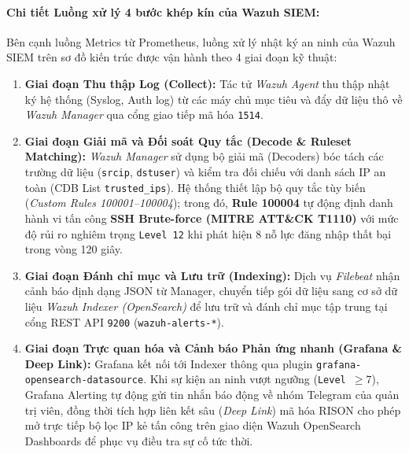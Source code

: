 \documentclass[13pt,a4paper]{extarticle}
\begin{document}
\paragraph{Chi tiết Luồng xử lý 4 bước khép kín của Wazuh SIEM:}
Bên cạnh luồng Metrics từ Prometheus, luồng xử lý nhật ký an ninh của Wazuh SIEM trên sơ đồ kiến trúc được vận hành theo 4 giai đoạn kỹ thuật:
\begin{enumerate}
    \item \textbf{Giai đoạn Thu thập Log (Collect):} Tác tử \textit{Wazuh Agent} thu thập nhật ký hệ thống (Syslog, Auth log) từ các máy chủ mục tiêu và đẩy dữ liệu thô về \textit{Wazuh Manager} qua cổng giao tiếp mã hóa \texttt{1514}.
    \item \textbf{Giai đoạn Giải mã và Đối soát Quy tắc (Decode \& Ruleset Matching):} \textit{Wazuh Manager} sử dụng bộ giải mã (Decoders) bóc tách các trường dữ liệu (\texttt{srcip}, \texttt{dstuser}) và kiểm tra đối chiếu với danh sách IP an toàn (CDB List \texttt{trusted\_ips}). Hệ thống thiết lập bộ quy tắc tùy biến (\textit{Custom Rules 100001--100004}); trong đó, \textbf{Rule 100004} tự động định danh hành vi tấn công \textbf{SSH Brute-force (MITRE ATT\&CK T1110)} với mức độ rủi ro nghiêm trọng \texttt{Level 12} khi phát hiện 8 nỗ lực đăng nhập thất bại trong vòng 120 giây.
    \item \textbf{Giai đoạn Đánh chỉ mục và Lưu trữ (Indexing):} Dịch vụ \textit{Filebeat} nhận cảnh báo định dạng JSON từ Manager, chuyển tiếp gói dữ liệu sang cơ sở dữ liệu \textit{Wazuh Indexer (OpenSearch)} để lưu trữ và đánh chỉ mục tập trung tại cổng REST API \texttt{9200} (\texttt{wazuh-alerts-*}).
    \item \textbf{Giai đoạn Trực quan hóa và Cảnh báo Phản ứng nhanh (Grafana \& Deep Link):} Grafana kết nối tới Indexer thông qua plugin \texttt{grafana-opensearch-datasource}. Khi sự kiện an ninh vượt ngưỡng (\texttt{Level $\ge 7$}), Grafana Alerting tự động gửi tin nhắn báo động về nhóm Telegram của quản trị viên, đồng thời tích hợp liên kết sâu (\textit{Deep Link}) mã hóa RISON cho phép mở trực tiếp bộ lọc IP kẻ tấn công trên giao diện Wazuh OpenSearch Dashboards để phục vụ điều tra sự cố tức thời.
\end{enumerate}
\end{document}
